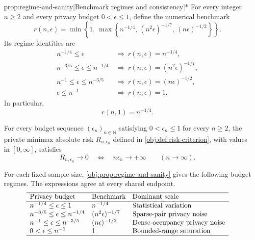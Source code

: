 \begin{propositionv}{prop:regime-and-sanity}[Benchmark regimes and consistency]*
For every integer \(n\ge2\) and every privacy budget \(0<\epsilon\le1\), define the numerical benchmark
\[
r(n,\epsilon)
=
\min\left\{1,\,
\max\left\{
n^{-1/4},\,
(n^2\epsilon)^{-1/7},\,
(n\epsilon)^{-1/2}
\right\}\right\}.
\]
Its regime identities are
\[
\begin{aligned}
n^{-1/4}\le\epsilon
&\ \Longrightarrow\ r(n,\epsilon)=n^{-1/4},\\
n^{-3/5}\le\epsilon\le n^{-1/4}
&\ \Longrightarrow\ r(n,\epsilon)=(n^2\epsilon)^{-1/7},\\
n^{-1}\le\epsilon\le n^{-3/5}
&\ \Longrightarrow\ r(n,\epsilon)=(n\epsilon)^{-1/2},\\
\epsilon\le n^{-1}
&\ \Longrightarrow\ r(n,\epsilon)=1.
\end{aligned}
\]
In particular,
\[
r(n,1)=n^{-1/4}.
\]

For every budget sequence \((\epsilon_n)_{n\in\mathbb N}\) satisfying \(0<\epsilon_n\le1\) for every \(n\ge2\), the private minimax absolute risk \(R_{n,\epsilon_n}\) defined in \cref{obj:def:risk-criterion}, with values in \([0,\infty]\), satisfies
\[
R_{n,\epsilon_n}\longrightarrow0
\quad\Longleftrightarrow\quad
n\epsilon_n\longrightarrow+\infty
\qquad(n\to\infty).
\]
\end{propositionv}

For each fixed sample size, \cref{obj:prop:regime-and-sanity} gives the following budget regimes. The expressions agree at every shared endpoint.
\[
\begin{array}{lll}
\hline
\text{Privacy budget} & \text{Benchmark} & \text{Dominant scale}\\
\hline
n^{-1/4}\le\epsilon\le1
& n^{-1/4}
& \text{Statistical variation}\\
n^{-3/5}\le\epsilon\le n^{-1/4}
& (n^2\epsilon)^{-1/7}
& \text{Sparse-pair privacy noise}\\
n^{-1}\le\epsilon\le n^{-3/5}
& (n\epsilon)^{-1/2}
& \text{Dense-occupancy privacy noise}\\
0<\epsilon\le n^{-1}
& 1
& \text{Bounded-range saturation}\\
\hline
\end{array}
\]

